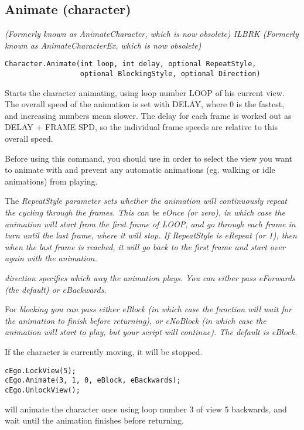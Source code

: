 \subsection{Animate (character)}\label{Character.Animate}%

\it{(Formerly known as AnimateCharacter, which is now obsolete)} ILBRK
\it{(Formerly known as AnimateCharacterEx, which is now obsolete)}

\begin{verbatim}
Character.Animate(int loop, int delay, optional RepeatStyle,
                  optional BlockingStyle, optional Direction)
\end{verbatim}
Starts the character animating, using loop number LOOP of his current view. The
overall speed of the animation is set with DELAY, where 0 is the fastest, and
increasing numbers mean slower. The delay for each frame is worked out as DELAY + FRAME SPD,
so the individual frame speeds are relative to this overall speed.

Before using this command, you should use  in order
to select the view you want to animate with and prevent any automatic animations (eg.
walking or idle animations) from playing.

The \it{RepeatStyle} parameter sets whether the animation will continuously repeat
the cycling through the frames. This can be \it{eOnce} (or zero), in which case the animation
will start from the first frame of LOOP, and go through each frame in turn until the
last frame, where it will stop. If RepeatStyle is \it{eRepeat} (or 1), then when the last frame
is reached, it will go back to the first frame and start over again with the animation.

\it{direction} specifies which way the animation plays. You can either pass eForwards (the
default) or eBackwards.

For \it{blocking} you can pass either eBlock (in which case the function will wait
for the animation to finish before returning), or eNoBlock (in which case the animation
will start to play, but your script will continue). The default is eBlock.

If the character is currently moving, it will be stopped.

\begin{verbatim}
cEgo.LockView(5);
cEgo.Animate(3, 1, 0, eBlock, eBackwards);
cEgo.UnlockView();
\end{verbatim}
will animate the character once using loop number 3 of view 5 backwards, and
wait until the animation finishes before returning.


